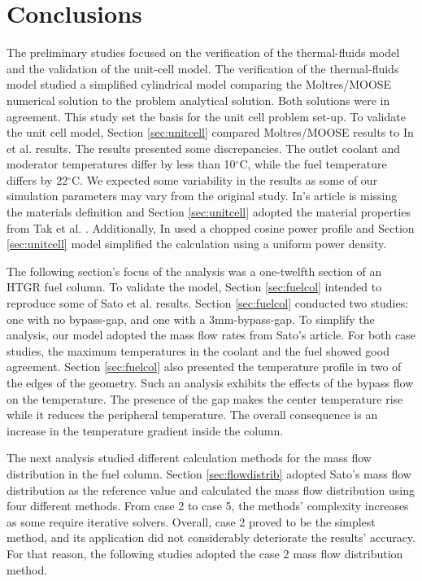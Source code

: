 \section{Conclusions}

The preliminary studies focused on the verification of the thermal-fluids model and the validation of the unit-cell model.
The verification of the thermal-fluids model studied a simplified cylindrical model comparing the Moltres/MOOSE numerical solution to the problem analytical solution.
Both solutions were in agreement.
This study set the basis for the unit cell problem set-up.
To validate the unit cell model, Section \ref{sec:unitcell} compared Moltres/MOOSE results to In et al. \cite{in_three-dimensional_2006} results.
The results presented some discrepancies.
The outlet coolant and moderator temperatures differ by less than 10$^{\circ}$C, while the fuel temperature differs by 22$^{\circ}$C.
We expected some variability in the results as some of our simulation parameters may vary from the original study.
In's article is missing the materials definition and Section \ref{sec:unitcell} adopted the material properties from Tak et al. \cite{tak_numerical_2008}.
Additionally, In used a chopped cosine power profile and Section \ref{sec:unitcell} model simplified the calculation using a uniform power density.

The following section's focus of the analysis was a one-twelfth section of an HTGR fuel column.
To validate the model, Section \ref{sec:fuelcol} intended to reproduce some of Sato et al. \cite{sato_computational_2010} results.
Section \ref{sec:fuelcol} conducted two studies: one with no bypass-gap, and one with a 3mm-bypass-gap.
To simplify the analysis, our model adopted the mass flow rates from Sato's article.
For both case studies, the maximum temperatures in the coolant and the fuel showed good agreement.
Section \ref{sec:fuelcol} also presented the temperature profile in two of the edges of the geometry.
Such an analysis exhibits the effects of the bypass flow on the temperature.
The presence of the gap makes the center temperature rise while it reduces the peripheral temperature.
The overall consequence is an increase in the temperature gradient inside the column.

The next analysis studied different calculation methods for the mass flow distribution in the fuel column.
Section \ref{sec:flowdistrib} adopted Sato's mass flow distribution as the reference value and calculated the mass flow distribution using four different methods.
From case 2 to case 5, the methods' complexity increases as some require iterative solvers.
Overall, case 2 proved to be the simplest method, and its application did not considerably deteriorate the results' accuracy.
For that reason, the following studies adopted the case 2 mass flow distribution method.

